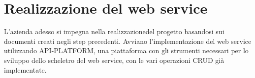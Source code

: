 \section{Realizzazione del web service}
L'azienda adesso si impegna nella realizzazionedel progetto basandosi sui documenti creati negli step precedenti.
Avviano l'implementazione del web service utilizzando API-PLATFORM, una piattaforma con gli strumenti necessari per lo sviluppo dello scheletro del web service, con le vari operazioni CRUD già implementate.
